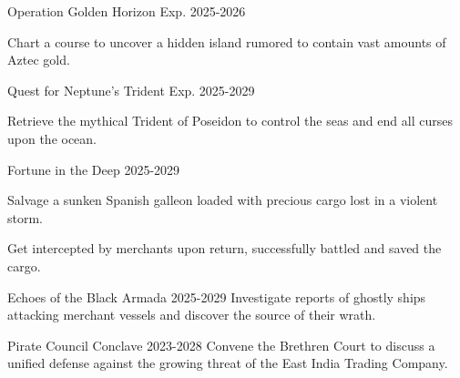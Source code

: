 


\begin{cventries}
\cventry
{Operation Golden Horizon} %
{}{}
{Exp. 2025-2026} %
{ %
\vspace{-4mm}
\begin{cvitemsnested}
    \item {Chart a course to uncover a hidden island rumored to contain vast amounts of Aztec gold.}
\end{cvitemsnested}
}

\cventry
{Quest for Neptune’s Trident} %
{}{}
{Exp. 2025-2029} %
{ %
\vspace{-4mm}
\begin{cvitemsnested}
    \item {Retrieve the mythical Trident of Poseidon to control the seas and end all curses upon the ocean.}
\end{cvitemsnested}
}

\cventry
{Fortune in the Deep} %
{}{}
{2025-2029} %
{ %
\vspace{-4mm}
\begin{cvitemsnested}
    \item {Salvage a sunken Spanish galleon loaded with precious cargo lost in a violent storm.}
    \item {Get intercepted by merchants upon return, successfully battled and saved the cargo. }
\end{cvitemsnested}
}

\cventry
{Echoes of the Black Armada} %
{}{}
{2025-2029} %
{ %
Investigate reports of ghostly ships attacking merchant vessels and discover the source of their wrath.
}

\cventry
{Pirate Council Conclave} %
{}{}
{2023-2028} %
{ %
Convene the Brethren Court to discuss a unified defense against the growing threat of the East India Trading Company.
}


\end{cventries}
